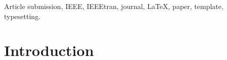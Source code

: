 \documentclass[lettersize,journal]{IEEEtran}
\begin{document}
\begin{IEEEkeywords}
Article submission, IEEE, IEEEtran, journal, \LaTeX, paper, template, typesetting.
\end{IEEEkeywords}


\section{Introduction}
\end{document}
